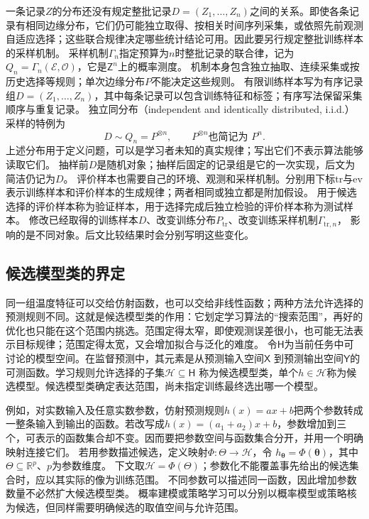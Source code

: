一条记录\(Z\)的分布还没有规定整批记录\(D=(Z_1,\ldots,Z_n)\)之间的关系。即使各条记录有相同边缘分布，它们仍可能独立取得、按相关时间序列采集，或依照先前观测自适应选择；这些联合规律决定哪些统计结论可用。因此要另行规定整批训练样本的采样机制。
采样机制$\Gamma_n$指定预算为$n$时整批记录的联合律，记为
$Q_n=\Gamma_n(\mathcal E,\mathcal O)$，它是$\mathsf Z^n$上的概率测度。
机制本身包含独立抽取、连续采集或按历史选择等规则；单次边缘分布$P$不能决定这些规则。
有限训练样本写为有序记录组$D=(Z_1,\ldots,Z_n)$，其中每条记录可以包含训练特征和标签；有序写法保留采集顺序与重复记录。
独立同分布（independent and identically distributed, i.i.d.）采样的特例为
\begin{equation}
  D\sim Q_n=P^{\otimes n},\qquad P^{\otimes n}\text{也简记为 }P^n.
  \label{eq:future-sampling-law}
\end{equation}
上述分布用于定义问题，可以是学习者未知的真实规律；写出它们不表示算法能够读取它们。
抽样前$D$是随机对象；抽样后固定的记录组是它的一次实现，后文为简洁仍记为$D$。
评价样本也需要自己的环境、观测和采样机制。分别用下标$\mathrm{tr}$与$\mathrm{ev}$
表示训练样本和评价样本的生成规律；两者相同或独立都是附加假设。
用于候选选择的评价样本称为验证样本，用于选择完成后独立检验的评价样本称为测试样本。
修改已经取得的训练样本$D$、改变训练分布$P_{\mathrm{tr}}$、改变训练采样机制$\Gamma_{\mathrm{tr},n}$，
影响的是不同对象。后文比较结果时会分别写明这些变化。

\subsection{候选模型类的界定}
\label{sec:future-candidate-model-class}

同一组温度特征可以交给仿射函数，也可以交给非线性函数；两种方法允许选择的预测规则不同。这就是候选模型类的作用：它划定学习算法的“搜索范围”，再好的优化也只能在这个范围内挑选。范围定得太窄，即使观测误差很小，也可能无法表示目标规律；范围定得太宽，又会增加拟合与泛化的难度。
令$\mathsf H$为当前任务中可讨论的模型空间。在监督预测中，其元素是从预测输入空间$\mathsf X$
到预测输出空间$\mathsf Y$的可测函数。学习规则允许选择的子集$\mathcal H\subseteq\mathsf H$
称为候选模型类，单个$h\in\mathcal H$称为候选模型。候选模型类确定表达范围，尚未指定训练最终选出哪一个模型。

例如，对实数输入及任意实数参数，仿射预测规则\(h(x)=ax+b\)把两个参数转成一整条输入到输出的函数。若改写成\(h(x)=(a_1+a_2)x+b\)，参数增加到三个，可表示的函数集合却不变。因而要把参数空间与函数集合分开，并用一个明确映射连接它们。
若用参数描述候选，定义映射$\Phi:\Theta\to\mathcal H$，令
$h_{\bm\theta}=\Phi(\bm\theta)$，其中$\Theta\subseteq\mathbb R^p$、$p$为参数维度。
下文取$\mathcal H=\Phi(\Theta)$；参数化不能覆盖事先给出的候选集合时，应以其实际的像为训练范围。
不同参数可以描述同一函数，因此增加参数数量不必然扩大候选模型类。
概率建模或策略学习可以分别以概率模型或策略核为候选，但同样需要明确候选的取值空间与允许范围。

